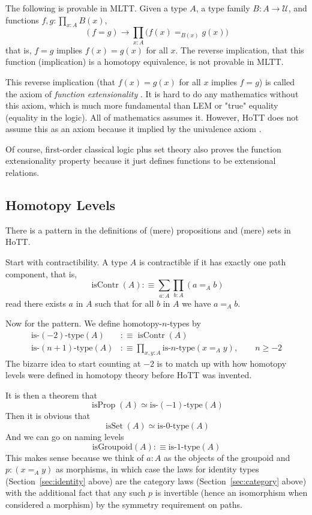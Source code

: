 \documentclass[11pt]{article}
\DeclareMathOperator{\isContr}{isContr}
\DeclareMathOperator{\isProp}{isProp}
\DeclareMathOperator{\isSet}{isSet}
\newcommand{\universe}{\mathcal{U}}
\begin{document}
The following is provable in MLTT. Given a type $A$,
a type family $B : A \to \universe$,
and functions $f, g : \prod_{x : A} B(x)$,
$$
   (f = g) \to \prod_{x : A} \bigl( f(x) =_{B(x)} g(x) \bigr)
$$
that is, $f = g$ implies $f(x) = g(x)$ for all $x$.
The reverse implication, that this function (implication)
is a homotopy equivalence, is not provable in MLTT.

This reverse implication (that $f(x) = g(x)$ for all $x$ implies $f = g$)
is called the axiom of \emph{function extensionality}
.
It is hard to do any mathematics without this axiom, which is much more
fundamental than LEM or "true" equality (equality in the logic).
All of mathematics assumes it.
However, HoTT does not assume this as an axiom because it implied
by the univalence axiom .

Of course, first-order classical logic plus set theory also
proves the function extensionality property because it just defines
functions to be extensional relations.

\subsection{Homotopy Levels}

There is a pattern in the definitions of (mere) propositions
and (mere) sets in HoTT.

Start with contractibility.  A type $A$ is contractible
if it has exactly one path component, that is,
\begin{equation} \label{eq:contractible}
   \isContr(A) :\equiv \sum_{a : A} \prod_{b : A} (a =_A b)
\end{equation}
read there exists $a$ in $A$ such that for all $b$ in $A$ we have $a =_A b$.

Now for the pattern.  We define homotopy-$n$-types
by
\begin{align}
   \text{is-$(- 2)$-type}(A) & :\equiv \isContr(A)
   \\
   \text{is-$(n + 1)$-type}(A)
   & :\equiv
   \prod_{x, y : A} \text{is-$n$-type}(x =_A y),
   \qquad n \ge -2
   \label{eq:type-recursion}
\end{align}
The bizarre idea to start counting at $- 2$ is to match up with how
homotopy levels were defined in homotopy theory before HoTT was invented.

It is then a theorem  that
$$
   \isProp(A) \simeq \text{is-$(-1)$-type}(A)
$$
Then it is obvious that
$$
   \isSet(A) \simeq \text{is-$0$-type}(A)
$$
And we can go on naming levels
$$
   \text{isGroupoid}(A) :\equiv \text{is-$1$-type}(A)
$$
This makes sense because we think of $a : A$ as the objects of the groupoid
and $p : (x =_A y)$ as morphisms, in which case the laws for identity types
(Section~\ref{sec:identity} above) are the category laws
(Section~\ref{sec:category} above) with the additional fact that any such $p$
is invertible (hence an isomorphism when considered a morphism) by the symmetry
requirement on paths.
\end{document}
